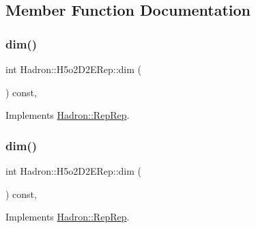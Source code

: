 \subsection{Member Function Documentation}
\mbox{\label{structHadron_1_1H5o2D2ERep_a40f428f685690d7f21b349010893970c}} 
\subsubsection{\texorpdfstring{dim()}{dim()}\hspace{0.1cm}{\footnotesize\ttfamily [1/5]}}
{\footnotesize\ttfamily int Hadron\+::\+H5o2\+D2\+E\+Rep\+::dim (\begin{DoxyParamCaption}{ }\end{DoxyParamCaption}) const\hspace{0.3cm}{\ttfamily [inline]}, {\ttfamily [virtual]}}



Implements \mbox{\hyperlink{structHadron_1_1RepRep_a92c8802e5ed7afd7da43ccfd5b7cd92b}{Hadron\+::\+Rep\+Rep}}.

\mbox{\label{structHadron_1_1H5o2D2ERep_a40f428f685690d7f21b349010893970c}} 
\subsubsection{\texorpdfstring{dim()}{dim()}\hspace{0.1cm}{\footnotesize\ttfamily [2/5]}}
{\footnotesize\ttfamily int Hadron\+::\+H5o2\+D2\+E\+Rep\+::dim (\begin{DoxyParamCaption}{ }\end{DoxyParamCaption}) const\hspace{0.3cm}{\ttfamily [inline]}, {\ttfamily [virtual]}}



Implements \mbox{\hyperlink{structHadron_1_1RepRep_a92c8802e5ed7afd7da43ccfd5b7cd92b}{Hadron\+::\+Rep\+Rep}}.

\mbox{\label{structHadron_1_1H5o2D2ERep_a40f428f685690d7f21b349010893970c}} 
